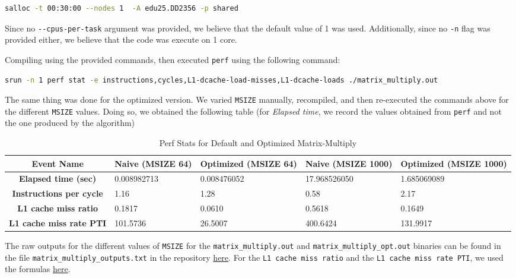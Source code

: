 \documentclass[a4paper,10pt]{article}
\begin{document}
\begin{lstlisting}[language=bash,basicstyle=\ttfamily]
salloc -t 00:30:00 --nodes 1  -A edu25.DD2356 -p shared
\end{lstlisting}
Since no \verb|--cpus-per-task| argument was provided, we believe that the default value of 1 was used. Additionally, since no \verb|-n| flag was provided either, we believe that the code was execute on 1 core. 

Compiling using the provided commands, then executed \verb|perf| using the following command: 
\begin{lstlisting}[language=bash,basicstyle=\tiny\ttfamily]
srun -n 1 perf stat -e instructions,cycles,L1-dcache-load-misses,L1-dcache-loads ./matrix_multiply.out
\end{lstlisting}
The same thing was done for the optimized version. We varied \verb|MSIZE| manually, recompiled, and then re-executed the commands above for the different \verb|MSIZE| values. 
Doing so, we obtained the following table (for \textit{Elapsed time}, we record the values obtained from \verb|perf| and not the one produced by the algorithm) 
\begin{table}[h!]
\centering
\begin{tabular}{|c|p{2.5cm}|p{2.5cm}|p{2.5cm}|p{2.5cm}|}
\hline
\textbf{Event Name} & \textbf{Naive (MSIZE 64)} & \textbf{Optimized (MSIZE 64)} & \textbf{Naive (MSIZE 1000)} & \textbf{Optimized (MSIZE 1000)} \\
\hline
\textbf{Elapsed time (sec)} & 0.008982713 & 0.008476052 & 17.968526050 & 1.685069089 \\
\hline
\textbf{Instructions per cycle} & 1.16 & 1.28 & 0.58 & 2.17 \\
\hline
\textbf{L1 cache miss ratio} & 0.1817 & 0.0610 & 0.5618 & 0.1649 \\
\hline
\textbf{L1 cache miss rate PTI} & 101.5736 & 26.5007 & 400.6424 & 131.9917  \\
\hline
\end{tabular}
\caption{Perf Stats for Default and Optimized Matrix-Multiply}
\end{table}
The raw outputs for the different values of \verb|MSIZE| for the \verb|matrix_multiply.out| and \verb|matrix_multiply_opt.out| binaries can be found in the file \verb|matrix_multiply_outputs.txt| in the repository \href{https://github.com/paulmyr/DD2356-MethodsHPC/blob/master/2_hpc_arch_perf_model/exercise4/matrix_multiply_outputs.txt}{here}. For the \verb|L1 cache miss ratio| and the \verb|L1 cache miss rate PTI|, we used the formulas \href{https://canvas.kth.se/courses/53216/pages/tutorial-the-perf-tool?module_item_id=1067474}{here}.
\end{document}
